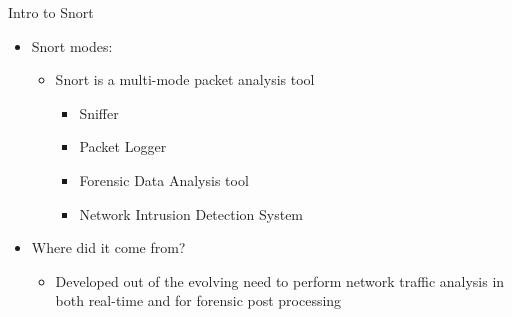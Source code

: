 \begin{frame}[t]{Intro to Snort}
  \fontsize{15.5}{18.5}\selectfont
  \vspace{0.15cm}
  \begin{itemize}
    \item Snort modes:
    \begin{itemize}
      \item Snort is a multi-mode packet analysis tool
      \begin{itemize}
        \item Sniffer
        \item Packet Logger
        \item Forensic Data Analysis tool
        \item Network Intrusion Detection System
      \end{itemize}
    \end{itemize}
    \item Where did it come from?
    \begin{itemize}
      \item Developed out of the evolving need to perform network traffic analysis in both real-time and for forensic post processing
    \end{itemize}
  \end{itemize}
\end{frame}
